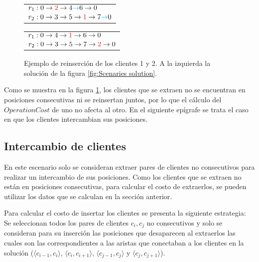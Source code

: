 \documentclass[12pt]{report}
\begin{document}
	\begin{figure}[h]
		\centering
		\begin{minipage}{0.45\textwidth}
			\begin{tabular}{l}
				$r_1:0 \rightarrow \textcolor{red}{2} \rightarrow 4 \textcolor{cyan}{\rightarrow} 6 \rightarrow 0$ \\
				$r_2:0 \rightarrow 3 \rightarrow 5 \rightarrow \textcolor{red}{1} \rightarrow 7 \textcolor{cyan}{\rightarrow} 0$ \\
			\end{tabular}
		\end{minipage}
		\hfill
		\begin{minipage}{0.45\textwidth}
			\begin{tabular}{l}
				$r_1:0 \rightarrow 4 \rightarrow \textcolor{red}{1} \rightarrow 6 \rightarrow 0$ \\
				$r_2:0 \rightarrow 3 \rightarrow 5 \rightarrow 7 \rightarrow \textcolor{red}{2} \rightarrow 0$ \\
			\end{tabular}
		\end{minipage}

		\caption{Ejemplo de reinserción de los clientes 1 y 2. A la izquierda la solución de la figura \ref{fig:Scenaries solution}.}
		\label{fig:Example-reinsert-clients}
              \end{figure}

	Como se muestra en la figura \ref{fig:Example-reinsert-clients}, los clientes que se extraen no se encuentran en posiciones consecutivas ni se reinsertan juntos, por lo que el cálculo del $OperationCost$ de uno no afecta al otro. En el siguiente epígrafe se trata el caso en que los clientes intercambian sus posiciones.

	\subsection{Intercambio de clientes}
	\label{sec:Intercambio de clientes}

	En este escenario solo se consideran extraer pares de clientes no consecutivos para realizar un intercambio de sus posiciones. Como los clientes que se extraen no están en posiciones consecutivas, para calcular el costo de extraerlos, se pueden utilizar los datos que se calculan en la sección anterior.

	Para calcular el costo de insertar los clientes se presenta la siguiente estrategia: Se seleccionan todos los pares de clientes $c_i,c_j$ no consecutivos y solo se consideran para su inserción las posiciones que desaparecen al extraerlos las cuales son las correspondientes a las aristas que conectaban a los clientes en la solución ($\langle c_{i-1},c_i \rangle$, $\langle c_i,c_{i+1} \rangle$, $\langle c_{j-1},c_j \rangle$ y $\langle c_j,c_{j+1} \rangle$).
\end{document}
